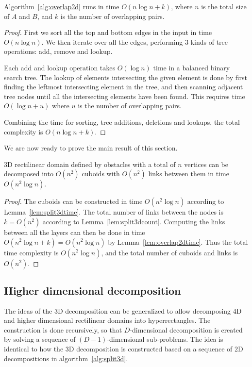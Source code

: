 \documentclass[english,gradu]{tktltiki2018}
\begin{document}
\begin{lem}\label{lem:overlap2dtime}Algorithm~\ref{alg:overlap2d} runs in time $O(n\log n + k)$, where $n$ is the total size of $A$ and $B$, and $k$ is the number of overlapping pairs.\end{lem}
\begin{proof}
First we sort all the top and bottom edges in the input in time $O(n\log n)$.
We then iterate over all the edges, performing 3 kinds of tree operations: add, remove and lookup.

Each add and lookup operation takes $O(\log n)$ time in a balanced binary search tree.
The lookup of elements intersecting the given element is done by first finding the leftmost intersecting element in the tree, and then scanning adjacent tree nodes until all the intersecting elements have been found.
This requires time $O(\log n+u)$ where $u$ is the number of overlapping pairs.

Combining the time for sorting, tree additions, deletions and lookups, the total complexity is $O(n\log n + k)$.
\end{proof}

We are now ready to prove the main result of this section.

\begin{theo}\label{theo:split3dtime}3D rectilinear domain defined by obstacles with a total of $n$ vertices can be decomposed into $O(n^2)$ cuboids with $O(n^2)$ links between them in time $O(n^2\log n).$\end{theo}
\begin{proof}
The cuboids can be constructed in time $O(n^2\log n)$ according to Lemma~\ref{lem:split3dtime}.
The total number of links between the nodes is $k=O(n^2)$ according to Lemma~\ref{lem:split3dcount}.
Computing the links between all the layers can then be done in time $O(n^2\log n+k)=O(n^2\log n)$ by Lemma~\ref{lem:overlap2dtime}.
Thus the total time complexity is $O(n^2\log n)$, and the total number of cuboids and links is $O(n^2)$.
\end{proof}

\subsection{Higher dimensional decomposition}

The ideas of the 3D decomposition can be generalized to allow decomposing 4D and higher dimensional rectilinear domains into hyperrectangles.
The construction is done recursively, so that $D$-dimensional decomposition is created by solving a sequence of $(D-1)$-dimensional sub-problems.
The idea is identical to how the 3D decomposition is constructed based on a sequence of 2D decompositions in algorithm~\ref{alg:split3d}.
\end{document}
